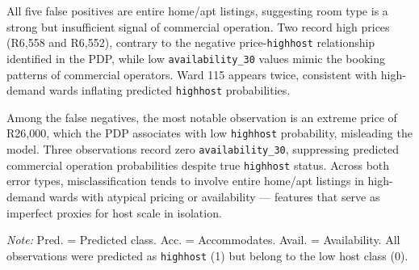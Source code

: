 \documentclass[11pt]{article}\usepackage[]{graphicx}\usepackage[]{xcolor}
\begin{document}
All five false positives are entire home/apt listings, suggesting room type is a strong 
but insufficient signal of commercial operation. Two record high prices (R6,558 and 
R6,552), contrary to the negative price-\texttt{highhost} relationship identified in 
the PDP, while low \texttt{availability\_30} values mimic the booking patterns of 
commercial operators. Ward 115 appears twice, consistent with high-demand wards 
inflating predicted \texttt{highhost} probabilities.

Among the false negatives, the most notable observation is an extreme price of R26,000, 
which the PDP associates with low \texttt{highhost} probability, misleading the model. 
Three observations record zero \texttt{availability\_30}, suppressing predicted 
commercial operation probabilities despite true \texttt{highhost} status. Across both 
error types, misclassification tends to involve entire home/apt listings in high-demand 
wards with atypical pricing or availability — features that serve as imperfect proxies 
for host scale in isolation.

\FloatBarrier
\begin{table}[H]
\centering
\caption{Five Randomly Sampled False Positives from Test Set Predictions}
\label{tab:fp_sample}
\par\smallskip
\footnotesize{\textit{Note:} Pred. = Predicted class. Acc. = Accommodates. Avail. = Availability. All observations were predicted as \texttt{highhost} (1) but belong to the low host class (0).}
\end{table}
\end{document}
